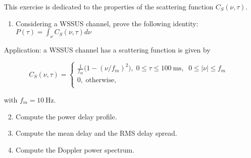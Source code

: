 \documentclass [a4paper, 11pt] {article}
\begin{document}
    \pagebreak
   \begin{exercise}{2}
       This exercise is dedicated to the properties of the scattering function $C_S(\nu, \tau)$.

        \begin{enumerate}
            \item Considering a WSSUS channel, prove the following identity: $P(\tau) = \int_{\nu} C_S(\nu, \tau) d\nu$
        \end{enumerate}

        Application: a WSSUS channel has a scattering function is given by

        \begin{equation}
             C_S(\nu, \tau) =\left\{
                        \begin{array}{ll}
                          \frac{1}{f_m}\big(1-(\nu/f_m)^2\big), \; 0 \leq \tau \leq \SI{100}{\milli\second}, \; \;  0 \leq |\nu| \leq f_m\\
                          0, \; \text{otherwise}, \\
                        \end{array}
                      \right.
        \end{equation}


        with $f_m = \SI{10}{\hertz}$.

        \begin{enumerate}
            \setcounter{enumi}{1}
            \item Compute the power delay profile.
            \item Compute the mean delay and the RMS delay spread.
            \item Compute the Doppler power spectrum.
        \end{enumerate}
   \end{exercise}
\end{document}
